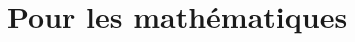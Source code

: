 \documentclass[12pt,a4paper]{article}
\begin{document}
\section{Pour les mathématiques}
\end{document}
